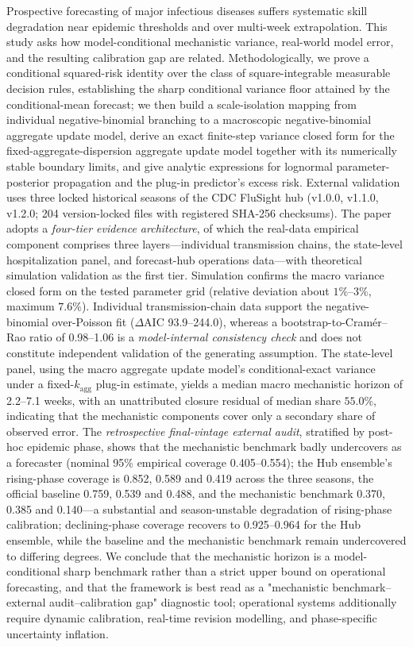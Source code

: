 \documentclass[11pt,a4paper]{article}
\theoremstyle{plain}
\theoremstyle{definition}
\begin{document}
 Prospective forecasting of major infectious diseases suffers systematic skill degradation near epidemic thresholds and over multi-week extrapolation. This study asks how model-conditional mechanistic variance, real-world model error, and the resulting calibration gap are related. Methodologically, we prove a conditional squared-risk identity over the class of square-integrable measurable decision rules, establishing the sharp conditional variance floor attained by the conditional-mean forecast; we then build a scale-isolation mapping from individual negative-binomial branching to a macroscopic negative-binomial aggregate update model, derive an exact finite-step variance closed form for the fixed-aggregate-dispersion aggregate update model together with its numerically stable boundary limits, and give analytic expressions for lognormal parameter-posterior propagation and the plug-in predictor's excess risk. External validation uses three locked historical seasons of the CDC FluSight hub (v1.0.0, v1.1.0, v1.2.0; 204 version-locked files with registered SHA-256 checksums). The paper adopts a \emph{four-tier evidence architecture}, of which the real-data empirical component comprises three layers---individual transmission chains, the state-level hospitalization panel, and forecast-hub operations data---with theoretical simulation validation as the first tier. Simulation confirms the macro variance closed form on the tested parameter grid (relative deviation about $1\%$--$3\%$, maximum $7.6\%$). Individual transmission-chain data support the negative-binomial over-Poisson fit ($\Delta\text{AIC}$ 93.9--244.0), whereas a bootstrap-to-Cramér--Rao ratio of 0.98--1.06 is a \emph{model-internal consistency check} and does not constitute independent validation of the generating assumption. The state-level panel, using the macro aggregate update model's conditional-exact variance under a fixed-$k_{\text{agg}}$ plug-in estimate, yields a median macro mechanistic horizon of 2.2--7.1 weeks, with an unattributed closure residual of median share $55.0\%$, indicating that the mechanistic components cover only a secondary share of observed error. The \emph{retrospective final-vintage external audit}, stratified by post-hoc epidemic phase, shows that the mechanistic benchmark badly undercovers as a forecaster (nominal 95\% empirical coverage 0.405--0.554); the Hub ensemble's rising-phase coverage is 0.852, 0.589 and 0.419 across the three seasons, the official baseline 0.759, 0.539 and 0.488, and the mechanistic benchmark 0.370, 0.385 and 0.140---a substantial and season-unstable degradation of rising-phase calibration; declining-phase coverage recovers to 0.925--0.964 for the Hub ensemble, while the baseline and the mechanistic benchmark remain undercovered to differing degrees. We conclude that the mechanistic horizon is a model-conditional sharp benchmark rather than a strict upper bound on operational forecasting, and that the framework is best read as a "mechanistic benchmark--external audit--calibration gap" diagnostic tool; operational systems additionally require dynamic calibration, real-time revision modelling, and phase-specific uncertainty inflation.
\end{document}

